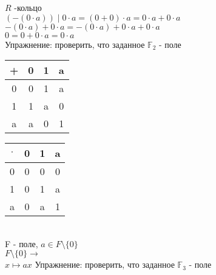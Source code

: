 $ R $ -кольцо \\
$ (-(0\cdot a)) \mid 0 \cdot a = (0+0) \cdot a = 0 \cdot a + 0 \cdot a $\\
\hspace*{15mm} $ -(0 \cdot a) + 0 \cdot a = -(0 \cdot a) +  0 \cdot a + 0\cdot a$ \\
\hspace*{15mm}$ 0 = 0 + 0 \cdot a = 0 \cdot a $\\
Упражнение: проверить, что заданное $ \mathbb{F}_2 $ - поле \\
\begin{tabular}{|c|c|c|c|}
	\hline 
+	& 0 & 1 & a \\ 
	\hline 
0	& 0 & 1 & a \\ 
	\hline 
1	& 1 & a & 0 \\ 
	\hline 
a	& a & 0 & 1 \\ 
	\hline 
\end{tabular} 
 \begin{tabular}{|c|c|c|c|}
	\hline 
	$\cdot$	& 0 & 1 & a \\ 
	\hline 
	0	& 0 & 0 & 0 \\ 
	\hline 
	1	& 0 & 1 & a \\ 
	\hline 
	a	& 0 & a & 1 \\ 
	\hline 
\end{tabular} \\
F - поле, $ a \in F \setminus \{0\} $ \\
$ F \setminus \{0\} \rightarrow   $\\
$ x \mapsto ax $
Упражнение: проверить, что заданное $ \mathbb{F}_3 $ - поле \\

